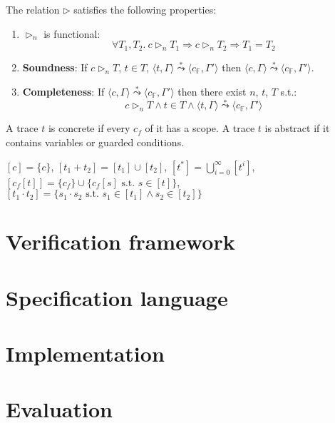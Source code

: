 \documentclass[runningheads]{llncs}
\newcommand{\conf}[1]{\langle #1 \rangle}
\newcommand{\eval}[1]{[ #1 ]}
\newcommand{\cstate}{\mathtt{\Gamma}}
\begin{document}
\begin{proposition}
	The relation $\triangleright$ satisfies the following properties:
	\begin{enumerate}
		\item $\triangleright_n$ is functional:
		$$
		\forall T_1,T_2.~c \triangleright_n T_1 \Rightarrow c \triangleright_n T_2 \Rightarrow T_1 = T_2
		$$
		\item \textbf{Soundness}: If $c \triangleright_n T$, $t \in T$, $\conf{t,\cstate} \stackrel{*}{\leadsto} \conf{c_{\mathbb{F}},\cstate'}$ then $\conf{c,\cstate} \stackrel{*}{\leadsto} \conf{c_{\mathbb{F}},\cstate'}$.
		\item \textbf{Completeness}: If $\conf{c,\cstate} \stackrel{*}{\leadsto} \conf{c_{\mathbb{F}},\cstate'}$ then there exist $n$, $t$, $T$ s.t.:
		$$c \triangleright_n T \wedge t \in T \wedge \conf{t,\cstate} \stackrel{*}{\leadsto} \conf{c_{\mathbb{F}},\cstate'}$$
	\end{enumerate}
	\end{proposition}
\begin{definition}
	A trace $t$ is concrete if every $c_f$ of it has a scope. A trace $t$ is abstract if it contains variables or guarded conditions.
	\end{definition}

\begin{definition}
	$\eval{c} = \{c\}$, $\eval{t_1+t_2} = \eval{t_1} \cup \eval{t_2}$, $\eval{t^*} = \bigcup_{i=0}^\infty \eval{t^i}$, $\eval{c_f[t]} = \{c_f\} \cup \{c_f[s] \textrm{ s.t. } s \in \eval{t}\}$, $\eval{t_1 \cdot t_2} = \{s_1 \cdot s_2 \textrm{ s.t. } s_1 \in \eval{t_1} \wedge s_2 \in \eval{t_2}\}$ 
	\end{definition}

\section{Verification framework}
%


\section{Specification language}




\section{Implementation}

\section{Evaluation}
\end{document}
